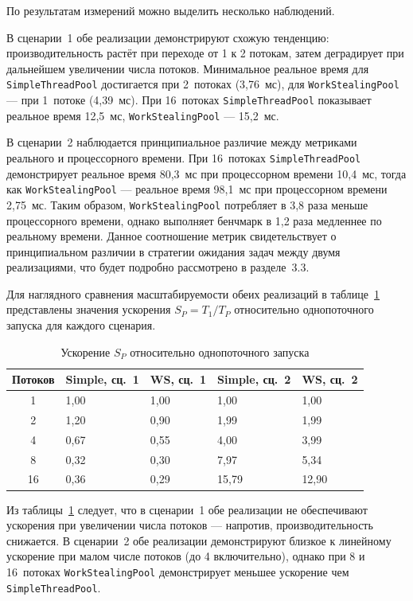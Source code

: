По результатам измерений можно выделить несколько наблюдений.

В сценарии~1 обе реализации демонстрируют схожую тенденцию:
производительность растёт при переходе от 1 к 2 потокам,
затем деградирует при дальнейшем увеличении числа потоков.
Минимальное реальное время для \texttt{SimpleThreadPool}
достигается при 2~потоках (3,76~мс), для
\texttt{WorkStealingPool} --- при 1~потоке (4,39~мс).
При 16~потоках \texttt{SimpleThreadPool} показывает реальное
время 12,5~мс, \texttt{WorkStealingPool} --- 15,2~мс.

В сценарии~2 наблюдается принципиальное различие между метриками
реального и процессорного времени. При 16~потоках
\texttt{SimpleThreadPool} демонстрирует реальное время 80,3~мс
при процессорном времени 10,4~мс, тогда как
\texttt{WorkStealingPool} --- реальное время 98,1~мс при
процессорном времени 2,75~мс. Таким образом,
\texttt{WorkStealingPool} потребляет в 3,8 раза меньше
процессорного времени, однако выполняет бенчмарк в 1,2 раза
медленнее по реальному времени. Данное соотношение метрик
свидетельствует о принципиальном различии в стратегии ожидания
задач между двумя реализациями, что будет подробно рассмотрено
в разделе~3.3.

Для наглядного сравнения масштабируемости обеих реализаций
в таблице~\ref{tab:speedup} представлены значения ускорения
$S_P = T_1 / T_P$ относительно однопоточного запуска
для каждого сценария.

\begin{table}[h]
\caption{Ускорение $S_P$ относительно однопоточного запуска}
\label{tab:speedup}
\begin{tabularx}{\textwidth}{|c|X|X|X|X|}
\hline
\textbf{Потоков} &
\textbf{Simple, сц.~1} &
\textbf{WS, сц.~1} &
\textbf{Simple, сц.~2} &
\textbf{WS, сц.~2} \\
\hline
1  & 1,00 & 1,00 & 1,00 & 1,00 \\
\hline
2  & 1,20 & 0,90 & 1,99 & 1,99 \\
\hline
4  & 0,67 & 0,55 & 4,00 & 3,99 \\
\hline
8  & 0,32 & 0,30 & 7,97 & 5,34 \\
\hline
16 & 0,36 & 0,29 & 15,79 & 12,90 \\
\hline
\end{tabularx}
\end{table}

Из таблицы~\ref{tab:speedup} следует, что в сценарии~1 обе
реализации не обеспечивают ускорения при увеличении числа
потоков --- напротив, производительность снижается. В сценарии~2
обе реализации демонстрируют близкое к линейному ускорение
при малом числе потоков (до 4 включительно), однако при 8 и
16~потоках \texttt{WorkStealingPool} демонстрирует меньшее
ускорение чем \texttt{SimpleThreadPool}.
